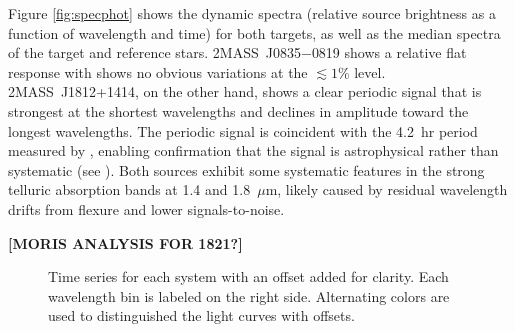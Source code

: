 \documentclass[twocolumn]{aastex6}
\newcommand{\sha}{2MASS~J0835$-$0819}
\newcommand{\shb}{2MASS~J1812+1414}
\begin{document}
Figure \ref{fig:specphot} shows the dynamic spectra (relative source brightness as a function of wavelength and time) for both targets, as well as the median spectra of the target and reference stars.  
{\sha} shows a relative flat response with shows no obvious variations at the $\lesssim1$\% level.
{\shb}, on the other hand, shows a clear periodic signal that is strongest at the shortest wavelengths and declines in amplitude toward the longest wavelengths. The periodic signal is coincident with the 4.2~hr period measured by \citet{2015ApJ...799..154M}, enabling confirmation that the signal is astrophysical rather than systematic (see \citealt{2016ApJ...826..156S}).
Both sources exhibit some systematic features in the strong telluric absorption bands at 1.4 and 1.8~$\mu$m, likely caused by residual wavelength drifts from flexure and lower signals-to-noise.

{\bf [MORIS ANALYSIS FOR 1821?]}


\begin{figure}[!t]
\centering
{}
	\caption{Time series for each system with an offset added for clarity. Each wavelength bin is labeled on the right side. Alternating colors are used to distinguished the light curves with offsets.}
	\label{fig:tserPfold}
\end{figure} 
\end{document}
